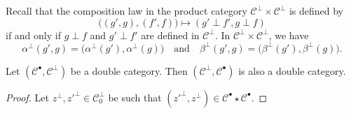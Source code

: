 \documentclass[a4paper,fleqn]{article}
\theoremstyle{plain}
\newenvironment{theorem}[1]
  {\renewcommand\theinnertheorem{#1}\innertheorem}
  {\endinnertheorem}
\theoremstyle{definition}
\newcommand{\oldpage}[1]{{\marginpar{\footnotesize$\bigg\vert$\,\,\,\,\textit{p.~#1}}}}
\newcommand{\textand}{\quad\text{and}\quad}
\newcommand{\CC}{\mathcal{C}}
\begin{document}
Recall that the composition law in the product category $\CC^\perp\times\CC^\perp$ is defined by
\[
  \big(
    (g',g), (f',f)
  \big)
  \longmapsto (g'\perp f',g\perp f)
\]
if and only if $g\perp f$ and $g'\perp f'$ are defined in $\CC^\perp$.
In $\CC^\perp\times\CC^\perp$, we have
\[
  \alpha^\perp(g',g)
  =\big(
    \alpha^\perp(g'), \alpha^\perp(g)
  \big)
  \textand
  \beta^\perp(g',g)
  =\big(
    \beta^\perp(g'), \beta^\perp(g)
  \big).
\]

\oldpage{390}

\begin{theorem}{4}
\label{theorem:ii-4}
  Let $(\CC^\bullet,\CC^\perp)$ be a double category.
  Then $(\CC^\perp,\CC^\bullet)$ is also a double category.
\end{theorem}

\begin{proof}
  Let $z^\perp,z'^\perp\in\CC_0^\perp$ be such that $(z'^\perp,z^\perp)\in\CC^\bullet\star\CC^\bullet$.
\end{proof}




\nocite{*}

\begingroup
\let\clearpage\relax
  \printbibliography[keyword={orig},heading=bibintoc,title=Bibliography]

  \printbibliography[keyword={oc},title={Citations to the collected works}]

  \printbibliography[keyword={comm},title={Citations from comments in the collected works}]
\endgroup
\end{document}
